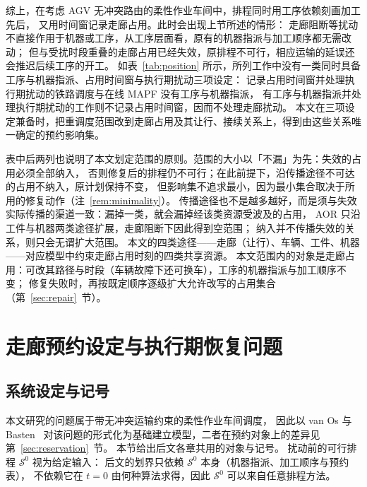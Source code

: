 \documentclass[manuscript,screen,review]{acmart}
\begin{document}
综上，在考虑 AGV 无冲突路由的柔性作业车间中，排程同时用工序依赖刻画加工先后，
又用时间窗记录走廊占用。此时会出现上节所述的情形：
走廊阻断等扰动不直接作用于机器或工序，从工序层面看，原有的机器指派与加工顺序都无需改动；
但与受扰时段重叠的走廊占用已经失效，原排程不可行，相应运输的延误还会推迟后续工序的开工。
如表~\ref{tab:position} 所示，所列工作中没有一类同时具备工序与机器指派、占用时间窗与执行期扰动三项设定：
记录占用时间窗并处理执行期扰动的铁路调度与在线 MAPF 没有工序与机器指派，
有工序与机器指派并处理执行期扰动的工作则不记录占用时间窗，因而不处理走廊扰动。
本文在三项设定兼备时，把重调度范围改到走廊占用及其让行、接续关系上，得到由这些关系唯一确定的预约影响集。

表中后两列也说明了本文划定范围的原则。范围的大小以「不漏」为先：失效的占用必须全部纳入，
否则修复后的排程仍不可行；在此前提下，沿传播途径不可达的占用不纳入，原计划保持不变，
但影响集不追求最小，因为最小集合取决于所用的修复动作（注~\ref{rem:minimality}）。
传播途径也不是越多越好，而是须与失效实际传播的渠道一致：漏掉一类，就会漏掉经该类资源受波及的占用，
AOR 只沿工件与机器两类途径扩展，走廊阻断下因此得到空范围；
纳入并不传播失效的关系，则只会无谓扩大范围。
本文的四类途径——走廊（让行）、车辆、工件、机器——对应模型中约束走廊占用时刻的四类共享资源。
本文范围内的对象是走廊占用：可改其路径与时段（车辆故障下还可换车），工序的机器指派与加工顺序不变；
修复失败时，再按既定顺序逐级扩大允许改写的占用集合（第~\ref{sec:repair}~节）。

\section{走廊预约设定与执行期恢复问题}
\label{sec:problem}

\subsection{系统设定与记号}
\label{sec:system_brief}

本文研究的问题属于带无冲突运输约束的柔性作业车间调度，
因此以 van Os 与 Basten~\cite{vanos2026exact} 对该问题的形式化为基础建立模型，二者在预约对象上的差异见第~\ref{sec:reservation}~节。
本节给出后文各章共用的对象与记号。
扰动前的可行排程 \(\mathcal{S}^0\) 视为给定输入：
后文的划界只依赖 \(\mathcal{S}^0\) 本身（机器指派、加工顺序与预约表），
不依赖它在 \(t=0\) 由何种算法求得，因此 \(\mathcal{S}^0\) 可以来自任意排程方法。
\end{document}
